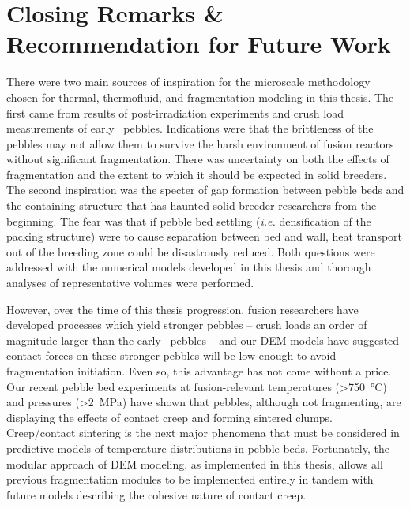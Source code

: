 \section{Closing Remarks \& Recommendation for Future Work}
There were two main sources of inspiration for the microscale methodology chosen for thermal, thermofluid, and fragmentation modeling in this thesis. The first came from results of post-irradiation experiments and crush load measurements of early \lis~pebbles. Indications were that the brittleness of the pebbles may not allow them to survive the harsh environment of fusion reactors without significant fragmentation. There was uncertainty on both the effects of fragmentation and the extent to which it should be expected in solid breeders. The second inspiration was the specter of gap formation between pebble beds and the containing structure that has haunted solid breeder researchers from the beginning. The fear was that if pebble bed settling (\textit{i.e.} densification of the packing structure) were to cause separation between bed and wall, heat transport out of the breeding zone could be disastrously reduced. Both questions were addressed with the numerical models developed in this thesis and thorough analyses of representative volumes were performed. 

However, over the time of this thesis progression, fusion researchers have developed processes which yield stronger pebbles -- crush loads an order of magnitude larger than the early \lis~pebbles -- and our DEM models have suggested contact forces on these stronger pebbles will be low enough to avoid fragmentation initiation. Even so, this advantage has not come without a price. Our recent pebble bed experiments at fusion-relevant temperatures (>\SI{750}{\celsius}) and pressures (>\SI{2}{\mega\pascal}) have shown that pebbles, although not fragmenting, are displaying the effects of contact creep and forming sintered clumps. Creep/contact sintering is the next major phenomena that must be considered in predictive models of temperature distributions in pebble beds. Fortunately, the modular approach of DEM modeling, as implemented in this thesis, allows all previous fragmentation modules to be implemented entirely in tandem with future models describing the cohesive nature of contact creep. 

